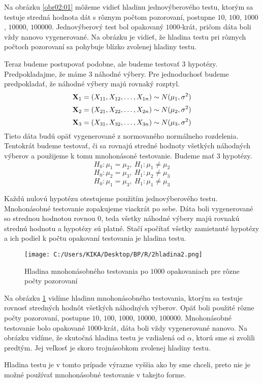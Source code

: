 Na obrázku \ref{obr02:01} môžeme vidieť hladinu jednovýberového testu, ktorým sa testuje stredná hodnota dát s rôznym počtom pozorovaní, 
postupne $10$, $100$, $1000$, $10000$, $100000$. 
Jednovýberový test bol opakovaný $1000$-krát, pričom dáta boli vždy nanovo vygenerované. 
Na obrázku je vidieť, že hladina testu pri rôznych počtoch pozorovaní sa pohybuje blízko zvolenej hladiny testu. 

Teraz budeme postupovať podobne, ale budeme testovať 3 hypotézy. 
Predpokladajme, že máme 3 náhodné výbery. 
Pre jednoduchosť budeme predpokladať, že náhodné výbery majú rovnaký rozptyl. 
$$ {\bf X}_1 = (X_{11}, X_{12}, \dots, X_{1n}) \sim N(\mu_1, \sigma^2) $$ 
$$ {\bf X}_2 = (X_{21}, X_{22}, \dots, X_{2n}) \sim N(\mu_2, \sigma^2) $$
$$ {\bf X}_3 = (X_{31}, X_{32}, \dots, X_{3n}) \sim N(\mu_3, \sigma^2) $$
Tieto dáta budú opäť vygenerované z normovaného normálneho rozdelenia. 
Tentokrát budeme testovať, či sa rovnajú stredné hodnoty všetkých náhodných výberov
a použijeme k tomu mnohonásoné testovanie. 
Budeme mať 3 hypotézy. 
$$ H_0: \mu_1 = \mu_2,~H_1: \mu_1 \neq \mu_2 $$ 
$$ H_0: \mu_2 = \mu_3,~H_1: \mu_2 \neq \mu_3 $$ 
$$ H_0: \mu_1 = \mu_3,~H_1: \mu_1 \neq \mu_3 $$ 

Každú nulovú hypotézu otestujeme použitím jednovýberového testu. 
Mnohonásobné testovanie zopakujeme viackrát po sebe. 
Dáta boli vygenerované so strednou hodnotou rovnou $0$, 
teda všetky náhodné výbery majú rovnakú strednú hodnotu a hypotézy sú platné. 
Stačí spočítať všetky zamietnuté hypotézy a ich podiel k počtu opakovaní testovania je hladina testu. 

\begin{figure}[h!]
  \centering
  \texttt{[image: C:/Users/KIKA/Desktop/BP/R/2hladina2.png]}
  \caption{Hladina mnohonásobného testovania po $1000$ opakovaniach pre rôzne počty pozorovaní}
  \label{obr02:02}
\end{figure}

Na obrázku \ref{obr02:02} vidíme hladinu mnohonásobného testovania, ktorým sa testuje rovnosť stredných hodnôt všetkých náhodných výberov. 
Opäť boli použité rôzne počty pozorovaní, postupne $10$, $100$, $1000$, $10000$, $100000$. 
Mnohonásobné testovanie bolo opakované $1000$-krát, dáta boli vždy vygenerované nanovo. 
Na obrázku vidíme, že skutočná hladina testu je vzdialená od $\alpha$, ktorú sme si zvolili predtým. 
Jej veľkosť je skoro trojnásobkom zvolenej hladiny testu. 

Hladina testu je v tomto prípade výrazne vyššia ako by sme chceli, 
preto nie je možné používať mnohonásobné testovanie v takejto forme. 




